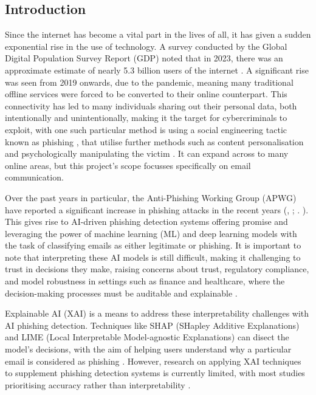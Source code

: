 \subsection*{Introduction}

Since the internet has become a vital part in the lives of all, it has given a sudden exponential rise in the use of technology. A survey conducted by the Global Digital Population Survey Report (GDP) noted that in 2023, there was an approximate estimate of nearly 5.3 billion users of the internet \citep{kemp2022digital}. A significant rise was seen from 2019 onwards, due to the pandemic, meaning many traditional offline services were forced to be converted to their online counterpart. This connectivity has led to many individuals sharing out their personal data, both intentionally and unintentionally, making it the target for cybercriminals to exploit, with one such particular method is using a social engineering tactic known as phishing \citep{zahra2022detecting}, that utilise further methods such as content personalisation and psychologically manipulating the victim \citep{jagatic2007social}. It can expand across to many online areas, but this project's scope focusses specifically on email communication.\newline 

\noindent Over the past years in particular, the Anti-Phishing Working Group (APWG) have reported a significant increase in phishing attacks in the recent years (\citeauthor{chirra2020ai}, \citeyear{chirra2020ai}; \citeauthor{syed2018ensuring}. \citeyear{syed2018ensuring}). This gives rise to AI-driven phishing detection systems offering promise and leveraging the power of machine learning (ML) and deep learning models with the task of classifying emails as either legitimate or phishing. It is important to note that interpreting these AI models is still difficult, making it challenging to trust in decisions they make, raising concerns about trust, regulatory compliance, and model robustness in settings such as finance and healthcare, where the decision-making processes must be auditable and explainable \citep{jain2022survey}.\newline

\noindent Explainable AI (XAI) is a means to address these interpretability challenges with AI phishing detection. Techniques like SHAP (SHapley Additive Explanations) and LIME (Local Interpretable Model-agnostic Explanations) can disect the model's decisions, with the aim of helping users understand why a particular email is considered as phishing \citep{lundberg2017unified}. However, research on applying XAI techniques to supplement phishing detection systems is currently limited, with most studies prioritising accuracy rather than interpretability \citep{ribeiro2016model}.\newline

